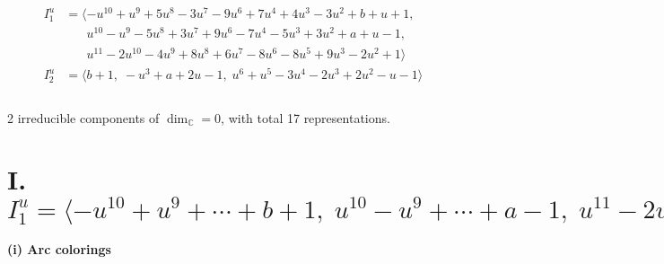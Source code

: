 \documentclass[1p]{elsarticle_modified}
\theoremstyle{definition}
\begin{document}
\begin{align*}
I^u_{1}&=\langle 
- u^{10}+u^9+5 u^8-3 u^7-9 u^6+7 u^4+4 u^3-3 u^2+b+u+1,\\
\phantom{I^u_{1}}&\phantom{= \langle  }u^{10}- u^9-5 u^8+3 u^7+9 u^6-7 u^4-5 u^3+3 u^2+a+u-1,\\
\phantom{I^u_{1}}&\phantom{= \langle  }u^{11}-2 u^{10}-4 u^9+8 u^8+6 u^7-8 u^6-8 u^5+9 u^3-2 u^2+1\rangle \\
I^u_{2}&=\langle 
b+1,\;- u^3+a+2 u-1,\;u^6+u^5-3 u^4-2 u^3+2 u^2- u-1\rangle \\
\\
\end{align*}
\raggedright * 2 irreducible components of $\dim_{\mathbb{C}}=0$, with total 17 representations.\\
\newpage
\renewcommand{\arraystretch}{1}
\centering \section*{I. $I^u_{1}= \langle - u^{10}+u^9+\cdots+b+1,\;u^{10}- u^9+\cdots+a-1,\;u^{11}-2 u^{10}+\cdots-2 u^2+1 \rangle$}
\flushleft \textbf{(i) Arc colorings}\\
\end{document}
